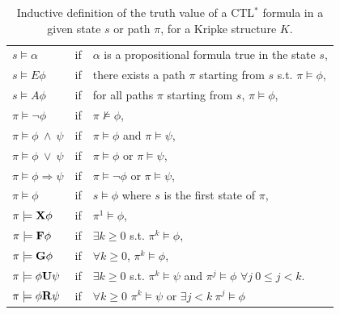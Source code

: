 \documentclass[graybox]{svmult}
\def\F{{\bf F}}
\def\G{{\bf G}}
\def\X{{\bf X}}
\def\U{{\bf U}}
\def\R{{\bf R}}
\begin{document}
\begin{table}[htb]
\begin{center}
\begin{tabular}{|lll|}
\hline
 $s\models\alpha$ & if &  $\alpha$ is a propositional formula true in the
 state $s$,\\
 $s\models E\phi$ & if &  there exists a path $\pi$ starting from $s$ s.t. $\pi\models\phi$,\\
 $s\models A\phi$ & if &  for all paths $\pi$ starting from $s$, $\pi\models\phi$,\\
 $\pi\models \neg\phi$ & if &  $\pi\not\models\phi$, \\
$\pi\models\phi\ \wedge\ \psi$ & if &  $\pi\models\phi$ and  $\pi\models\psi$, \\
$\pi\models\phi\ \vee\ \psi$ & if &  $\pi\models\phi$ or  $\pi\models\psi$, \\
 $\pi\models\phi\Rightarrow\psi$ & if &  $\pi\models\neg\phi$ or $\pi\models\psi$, \\
 $\pi\models\phi$ & if &  $s\models\phi$ where $s$ is the first state of $\pi$, \\
 $\pi\models \X\phi$ & if &  $\pi^1\models\phi$, \\
 $\pi\models \F\phi$ & if &  $\exists k\ge 0$ s.t. $\pi^k\models\phi$, \\
 $\pi\models \G\phi$ & if &  $\forall k\ge 0$, $\pi^k\models\phi$, \\
 $\pi\models \phi \U \psi$ & if & $\exists k\ge 0$ s.t.
$\pi^k\models\psi$ and $\pi^j\models \phi$ $\forall j\ 0\le j<k$.\\
 $\pi\models \phi \R \psi$ & if & $\forall k\ge 0$ $\pi^k\models\psi$ or $\exists j<k\ \pi^j\models \phi$\\
\hline
\end{tabular}
\end{center}
\caption{Inductive definition of the truth value of a CTL$^*$ formula in a given
state $s$ or path $\pi$, for a Kripke structure $K$.}
\label{CTLtruth}
\end{table}
\end{document}
